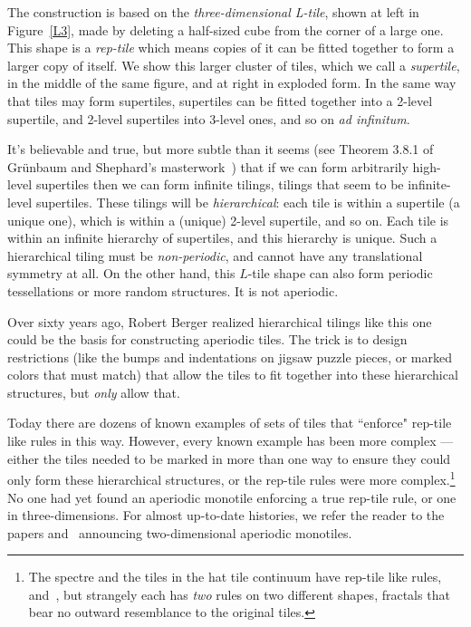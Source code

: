 \documentclass[11pt, oneside]{article}
\def\vp{\vspace{3ex}}
\begin{document}
  
  The construction is based on  the {\em three-dimensional L-tile}, shown at left in Figure~\ref{L3},  made by deleting a half-sized cube from the corner of a large one.   
  This shape is a {\em rep-tile} which means copies of it can be fitted together to form a larger copy of itself. 
  We show this larger cluster of tiles, which we call a {\em supertile}, in the middle of the same figure, and at right in exploded form. In the same way that tiles may  form supertiles, supertiles can be fitted together  into a 2-level supertile, and 2-level supertiles into 3-level ones, and so on {\em ad infinitum}. 

It's  believable and true, but more subtle than it seems (see Theorem 3.8.1 of Gr\"unbaum and Shephard's masterwork~\cite{grsh}) that if we can form arbitrarily high-level supertiles then we can  form infinite tilings, tilings that seem to be infinite-level supertiles. 
These tilings will be {\em hierarchical}:  each tile is within a supertile (a unique one), which is within a (unique) 2-level supertile, and so on. Each tile is within an infinite hierarchy of supertiles, and this hierarchy is unique. Such a hierarchical tiling must be {\em non-periodic}, and cannot have any translational symmetry at all.  On the other hand, this $L$-tile shape can also form periodic tessellations or more random structures. It is not aperiodic. 

Over sixty years ago, Robert Berger realized hierarchical tilings like this one could be the basis for constructing {aperiodic}  tiles\cite{berger}.  The trick is to design restrictions (like the bumps and indentations on jigsaw puzzle pieces, or marked colors that must match) that allow the tiles to fit together into these hierarchical structures, but {\em only} allow that.  

\vp
 Today there are dozens of known examples of sets of tiles that ``enforce" rep-tile like rules in this way. However, every known example has been more complex  --- either the tiles needed to be marked in more than one way to ensure they could only form these hierarchical structures, or the  rep-tile rules were more complex.\footnote{The spectre and the tiles in the hat tile continuum have rep-tile like rules,~\cite[Figure 2.11]{hat} and~\cite[Figure 2.1]{spectre}, but strangely each has {\em two} rules on two different shapes, fractals that bear no outward resemblance to the original tiles.}
 No one had yet found an aperiodic monotile enforcing a true rep-tile rule, or one in three-dimensions.  For almost up-to-date histories, we refer the reader to the papers \cite{hat} and~\cite{spectre} announcing two-dimensional aperiodic monotiles.
 
\end{document}
